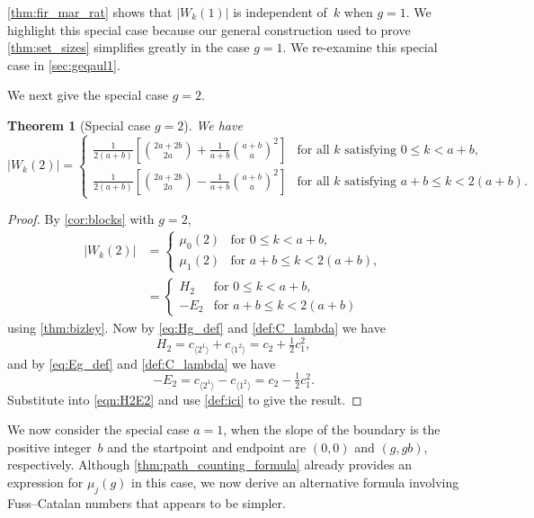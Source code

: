\documentclass[11pt]{article}
\newtheorem{thm}{Theorem}[section] %
\theoremstyle{definition} %
\numberwithin{equation}{section}
\begin{document}
\cref{thm:fir_mar_rat} shows that $|W_k(1)|$ is independent of~$k$ when $g=1$.
We highlight this special case because our general construction used to prove \cref{thm:set_sizes} simplifies greatly in the case $g=1$.  We re-examine this special case in \cref{sec:geqaul1}.


We next give the special case $g=2$.

\begin{thm}[Special case $g=2$]\label{thm:speccase2}
We have
\begin{equation}
|W_k(2)| = \begin{cases}  
    \displaystyle{\frac{1}{2(a+b)}\left[ \binom{2a+2b}{2a}+\frac{1}{a+b}\binom{a+b}{a}^2 \right]} &
     \mbox{for all $k$ satisfying $0 \le k < a+b$},\label{eq:bizg2} \\[3ex]
    \displaystyle{\frac{1}{2(a+b)}\left[ \binom{2a+2b}{2a}-\frac{1}{a+b}\binom{a+b}{a}^2 \right]} &
    \mbox{for all $k$ satisfying $a+b \le k < 2(a+b)$}.
    \end{cases}
\end{equation}
\end{thm}
\begin{proof}
By \cref{cor:blocks} with $g=2$,
\begin{align}
|W_k(2)| &= \begin{cases}  
     \mu_0(2) & \mbox{for $0 \le k < a+b$}, \\
     \mu_1(2) & \mbox{for $a+b \le k < 2(a+b),$}
    \end{cases}\\
        &= \begin{cases}  
     H_2 & \mbox{for $0 \le k < a+b$}, \\
     -E_2 & \mbox{for $a+b \le k < 2(a+b)$} 
     \label{eqn:H2E2}
    \end{cases}
\end{align}
using \cref{thm:bizley}.
Now by \eqref{eq:Hg_def} and \eqref{def:C_lambda} we have
\[
H_2 = c_{\langle 2^1 \rangle} + c_{\langle 1^2 \rangle} = c_2 + \tfrac{1}{2}c_1^2,
\]
and by \eqref{eq:Eg_def} and \eqref{def:C_lambda} we have
\[
-E_2 = c_{\langle 2^1 \rangle} - c_{\langle 1^2 \rangle} = c_2 - \tfrac{1}{2}c_1^2.
\]
Substitute into \eqref{eqn:H2E2} and use \eqref{def:ici} to give the result.
\end{proof}

We now consider the special case $a=1$, when the slope of the boundary is the positive integer~$b$ and the startpoint and endpoint are $(0,0)$ and $(g,gb)$, respectively. Although \cref{thm:path_counting_formula} already provides an expression for $\mu_j(g)$ in this case, we now derive an alternative formula involving Fuss--Catalan numbers that appears to be simpler.
\end{document}
